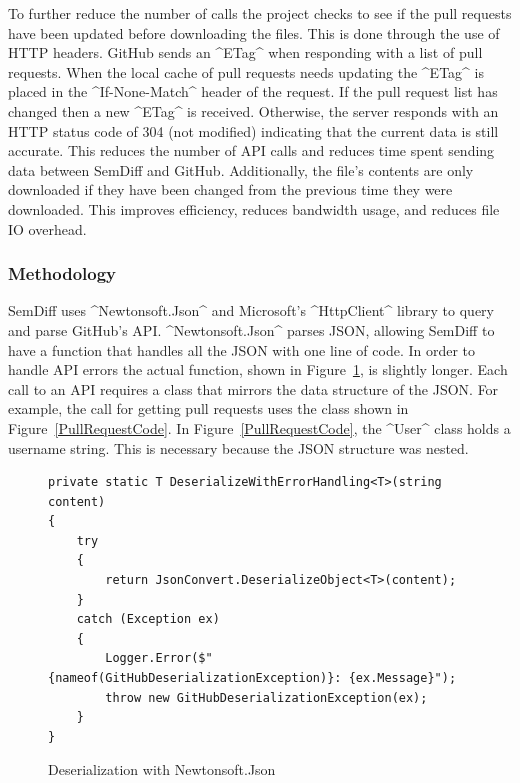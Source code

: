 \documentclass[draftclsnofoot,onecolumn]{IEEEtran}
\begin{document}
To further reduce the number of calls the project checks to see if the pull 
requests have been updated before downloading the files. This is done through 
the use of HTTP headers. GitHub sends an ^ETag^ when responding with a list of 
pull requests. When the local cache of pull requests needs updating the ^ETag^ 
is placed in the ^If-None-Match^ header of the request. If the pull request 
list has changed then a new ^ETag^ is received. Otherwise, the server responds 
with an HTTP status code of 304 (not modified) indicating that the current 
data is still accurate. This reduces the number of API calls and reduces time 
spent sending data between SemDiff and GitHub. Additionally, the file's contents 
are only downloaded if they have been changed from the previous time 
they were downloaded. This improves efficiency, reduces bandwidth usage, and 
reduces file IO overhead. 

\subsubsection{Methodology}

SemDiff uses ^Newtonsoft.Json^ and Microsoft's ^HttpClient^ library to query 
and parse GitHub's API. ^Newtonsoft.Json^ parses JSON, allowing SemDiff to 
have a function that handles all the JSON with one line of code. In order to 
handle API errors the actual function, shown in 
Figure~\ref{deserializeNewtonsoft}, is slightly longer. Each call to an API 
requires a class that mirrors the data structure of the JSON. For example, the 
call for getting pull requests uses the class shown in 
Figure~\ref{PullRequestCode}. In Figure~\ref{PullRequestCode}, the ^User^ 
class holds a username string. This is necessary because the JSON structure 
was nested.

\begin{figure}[!htb]
\centering
\begin{lstlisting}
private static T DeserializeWithErrorHandling<T>(string content)
{
    try
    {
        return JsonConvert.DeserializeObject<T>(content);
    }
    catch (Exception ex)
    {
        Logger.Error($"{nameof(GitHubDeserializationException)}: {ex.Message}");
        throw new GitHubDeserializationException(ex);
  	}
}
\end{lstlisting}
\caption{Deserialization with Newtonsoft.Json}
\label{deserializeNewtonsoft}
\end{figure}
\end{document}
